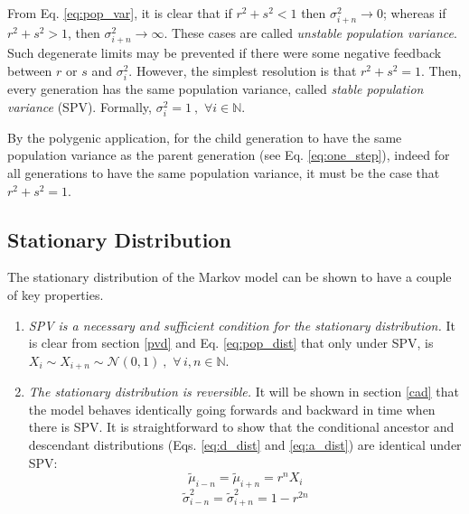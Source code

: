 \documentclass{svproc} %
\begin{document}
From Eq. \ref{eq:pop_var}, it is clear that if $r^2+s^2 < 1$ then $\sigma_{i+n}^2 \rightarrow 0$; whereas if $r^2+s^2 > 1$, then $\sigma_{i+n}^2 \rightarrow \infty$. These cases are called \emph{unstable population variance}. Such degenerate limits may be prevented if there were some negative feedback between $r$ or $s$ and $\sigma_i^2$. However, the simplest resolution is that $r^2+s^2 = 1$. Then, every generation has the same population variance, called \emph{stable population variance} (SPV). Formally, $\sigma_i^2 = 1 \ , \,\, \forall i \in \mathbb{N}$. 

By the polygenic application, for the child generation to have the same population variance as the parent generation (see Eq. \ref{eq:one_step}), indeed for all generations to have the same population variance, it must be the case that  $r^2+s^2 = 1$. 




\subsection{Stationary Distribution}

The stationary distribution of the Markov model can be shown to have a couple of key properties.

\begin{enumerate}
%
\item \emph{SPV is a necessary and sufficient condition for the stationary distribution.} It is clear from section \ref{pvd} and Eq. \ref{eq:pop_dist} that only under SPV, is $X_i \sim X_{i+n} \sim \mathcal{N}(0, 1) \ , \,\, \forall \, i, n \in \mathbb{N}$. 

\item \emph{The stationary distribution is reversible.} It will be shown in section \ref{cad} that the model behaves identically going forwards and backward in time when there is SPV. It is straightforward to show that the conditional ancestor and descendant distributions (Eqs. \ref{eq:d_dist} and \ref{eq:a_dist}) are identical under SPV:
\begin{equation}
\tilde{\mu}_{i-n} = \tilde{\mu}_{i+n} = r^nX_i
\label{eq:stable_mean}
%
\end{equation}
\begin{equation}
\tilde{\sigma}_{i-n}^2 = \tilde{\sigma}_{i+n}^2 = 1-r^{2n}
\label{eq:stable_var}
\end{equation}
%
\end{enumerate}
\end{document}
